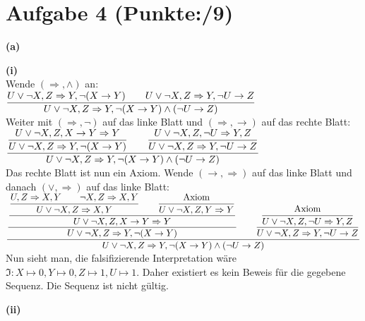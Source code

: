 \documentclass[11pt, a4paper]{article}
\newcommand{\ppp}{9}
\begin{document}
\section*{Aufgabe 4 (Punkte:\qquad/\ppp)}
\textbf{(a)}
\begin{adjustwidth}{20pt}{20pt}
\textbf{(i)}\\

Wende $(\Rightarrow,\wedge)$ an:\\

$
\dfrac
{U\vee \neg X,Z \Rightarrow Y,\neg (X \rightarrow Y) \text{\qquad} U\vee \neg X,Z \Rightarrow Y,\neg U \rightarrow Z}
{U\vee \neg X,Z \Rightarrow Y,\neg (X \rightarrow Y)\wedge (\neg U \rightarrow Z)}
$\\

Weiter mit $(\Rightarrow, \neg)$ auf das linke Blatt und $(\Rightarrow, \rightarrow)$  auf das rechte Blatt:\\ 

$
\dfrac
{\dfrac{U\vee \neg X,Z,X \rightarrow Y \Rightarrow Y}{U\vee \neg X,Z \Rightarrow Y,\neg (X \rightarrow Y)} \text{\qquad} \dfrac{U\vee \neg X,Z,\neg U \Rightarrow Y,Z}{U\vee \neg X,Z \Rightarrow Y,\neg U \rightarrow Z}}
{U\vee \neg X,Z \Rightarrow Y,\neg (X \rightarrow Y)\wedge (\neg U \rightarrow Z)}
$\\

Das rechte Blatt ist nun ein Axiom. Wende $(\rightarrow, \Rightarrow)$ auf das linke Blatt und danach $(\vee,\Rightarrow)$ auf das linke Blatt:\\

$
\dfrac
{\dfrac{
		\dfrac
		{\dfrac
			{U,Z \Rightarrow X,Y \text{\qquad} \neg X,Z \Rightarrow X,Y}
			{U\vee \neg X,Z \Rightarrow X,Y}
		 \text{\qquad} 
		 \dfrac{\text{Axiom}}{U\vee \neg X,Z,Y \Rightarrow Y}}
		{U\vee \neg X,Z,X \rightarrow Y \Rightarrow Y}}
{U\vee \neg X,Z \Rightarrow Y,\neg (X \rightarrow Y)} \text{\qquad} \dfrac
	{	\dfrac
		{\text{Axiom}}
		{U\vee \neg X,Z,\neg U \Rightarrow Y,Z}}
	{U\vee \neg X,Z \Rightarrow Y,\neg U \rightarrow Z}}
{U\vee \neg X,Z \Rightarrow Y,\neg (X \rightarrow Y)\wedge (\neg U \rightarrow Z)}
$\\

Nun sieht man, die falsifizierende Interpretation wäre $\mathfrak{I}: X \mapsto 0, Y \mapsto 0, Z \mapsto 1, U \mapsto 1$. Daher existiert es kein Beweis für die gegebene Sequenz. Die Sequenz ist nicht gültig.\\
\vspace*{35pt}

\textbf{(ii)}\\


\end{adjustwidth}
\end{document}
